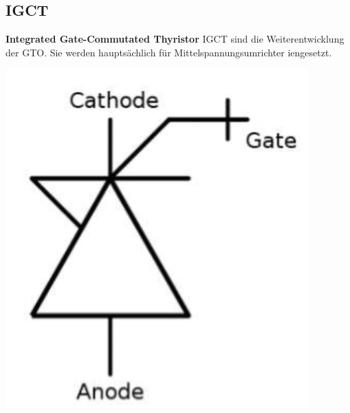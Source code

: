 \begin{minipage}{0.5\linewidth}
    \subsection{IGCT}
    \begin{minipage}{0.7\linewidth}
        \textbf{Integrated Gate-Commutated Thyristor}
        IGCT sind die Weiterentwicklung der GTO.\newline
        Sie werden hauptsächlich für Mittelspannungsumrichter iengesetzt.
    \end{minipage}
    \begin{minipage}{0.2\linewidth}
        \includegraphics[width=\linewidth]{images/IGCTSymbol}
    \end{minipage} 
\end{minipage}
\clearpage





















